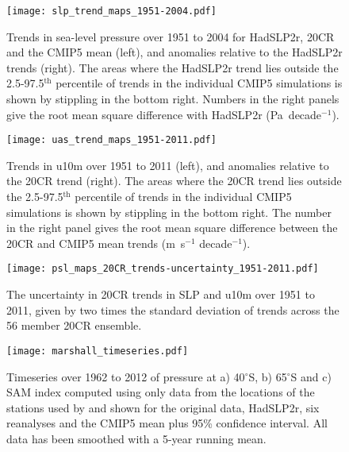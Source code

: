 \documentclass{ametsoc}
\begin{document}
\begin{figure}[t]
  \noindent\texttt{[image: slp\_trend\_maps\_1951-2004.pdf]}\\
  \caption{Trends in sea-level pressure over 1951 to 2004 for HadSLP2r, 20CR and the CMIP5 mean (left),
   and anomalies relative to the HadSLP2r trends (right). The areas where the HadSLP2r trend lies 
   outside the 2.5-97.5$^\textrm{th}$ percentile of trends in the individual CMIP5 simulations is shown 
   by stippling in the bottom right. Numbers in the right panels give the root mean square difference 
   with HadSLP2r (Pa~decade$^{-1}$).}\label{fig:slp_trend_maps_1951-2004}
\end{figure}

\begin{figure}[t]
  \noindent\texttt{[image: uas\_trend\_maps\_1951-2011.pdf]}\\
  \caption{Trends in u10m over 1951 to 2011 (left), and anomalies relative to the 20CR trend (right). 
  The areas where the 20CR trend lies outside the 2.5-97.5$^\textrm{th}$ percentile of trends in the individual
   CMIP5 simulations is shown by stippling in the bottom right. The number in the right panel gives the 
   root mean square difference between the 20CR and CMIP5 mean trends (m~s$^{-1}$ decade$^{-1}$).}\label{fig:uas_trend_maps_1951-2011}
\end{figure}

\begin{figure}[t]
  \noindent\texttt{[image: psl\_maps\_20CR\_trends-uncertainty\_1951-2011.pdf]}\\
  \caption{The uncertainty in 20CR trends in SLP and u10m over 1951 to 2011, given
           by two times the standard deviation of trends across the 56 member 20CR ensemble.}
           \label{fig:20CR_uncertainty_map}
\end{figure}

\begin{figure}[t]
  \noindent\texttt{[image: marshall\_timeseries.pdf]}\\
  \caption{Timeseries over 1962 to 2012 of pressure at a) 40$^{\circ}$S, b) 65$^{\circ}$S and 
          c) SAM index computed
          using only data from the locations of the stations used by \cite{Marshall_2003} and shown for
          the original \cite{Marshall_2003} data, HadSLP2r, six reanalyses and the CMIP5 mean plus 95\% 
          confidence interval. All data has been smoothed with a 5-year running mean.} \label{fig:marshall_timeseries}
\end{figure}
\end{document}
